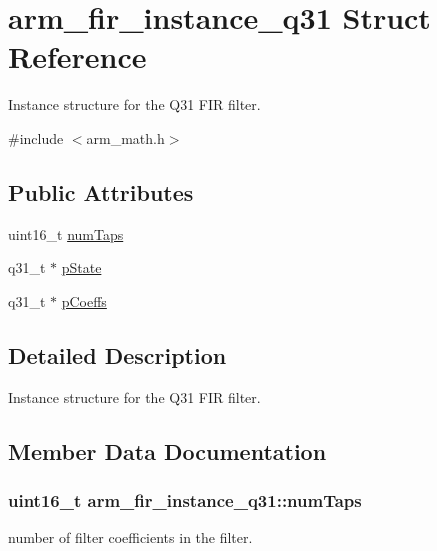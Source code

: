 \hypertarget{structarm__fir__instance__q31}{}\section{arm\+\_\+fir\+\_\+instance\+\_\+q31 Struct Reference}
\label{structarm__fir__instance__q31}


Instance structure for the Q31 F\+IR filter.  




{\ttfamily \#include $<$arm\+\_\+math.\+h$>$}

\subsection*{Public Attributes}
\begin{DoxyCompactItemize}
\item 
uint16\+\_\+t \hyperlink{structarm__fir__instance__q31_a918fadd775b7a0482b21bf34dae2f094}{num\+Taps}
\item 
q31\+\_\+t $\ast$ \hyperlink{structarm__fir__instance__q31_a409f39c93b744784648bdc365541444d}{p\+State}
\item 
q31\+\_\+t $\ast$ \hyperlink{structarm__fir__instance__q31_afaae4c884bdf11a4ec2f3b9bb2bb51d0}{p\+Coeffs}
\end{DoxyCompactItemize}


\subsection{Detailed Description}
Instance structure for the Q31 F\+IR filter. 

\subsection{Member Data Documentation}
\subsubsection[{\texorpdfstring{num\+Taps}{numTaps}}]{\setlength{\rightskip}{0pt plus 5cm}uint16\+\_\+t arm\+\_\+fir\+\_\+instance\+\_\+q31\+::num\+Taps}\hypertarget{structarm__fir__instance__q31_a918fadd775b7a0482b21bf34dae2f094}{}\label{structarm__fir__instance__q31_a918fadd775b7a0482b21bf34dae2f094}
number of filter coefficients in the filter. 
